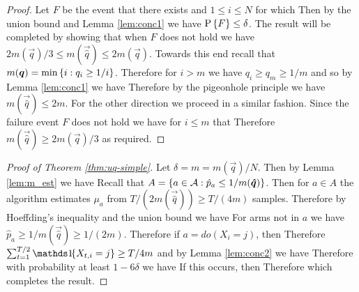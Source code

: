 \begin{proof}
Let $F$ be the event that there exists and $1 \leq i \leq N$ for which
Then by the union bound and Lemma \ref{lem:conc1} we have $\P{F} \leq \delta$. The result will be completed by showing that
when $F$ does not hold we have $2m(\vec{q})/3 \leq m(\vec{\hat q}) \leq 2m(\vec{q})$.
Towards this end recall that $m(\vec{q}) = \min\set{i : q_i \geq 1 / i}$.
Therefore for $i > m$ we have $q_i \geq q_m \geq 1/m$ and so by Lemma \ref{lem:conc1} we have
Therefore by the pigeonhole principle we have $m(\vec{\hat q}) \leq 2m$.
For the other direction we proceed in a similar fashion. Since the failure event $F$ does not hold we have for $i \leq m$ that
Therefore $m(\vec{\hat q}) \geq 2m(\vec{q}) / 3$ as required. 
\end{proof}

\begin{proof}[Proof of Theorem \ref{thm:uq-simple}]
Let $\delta = m = m(\vec{q}) / N$. Then by Lemma \ref{lem:m_est} we have 
Recall that $A = \set{a \in \actions : \hat p_a \leq 1/m(\vec{\hat q})}$. Then
for $a \in A$ the algorithm estimates $\mu_a$ from $T/(2m(\vec{\hat q})) \geq T/(4m)$ samples.
Therefore by Hoeffding's inequality and the union bound we have
For arms not in $a$ we have $\hat p_a \geq 1/m(\vec{\hat q}) \geq 1/(2m)$.
Therefore if $a = do(X_i = j)$, then 
Therefore $\sum_{t=1}^{T/2} \ind{X_{t,i} = j} \geq T/4m$
and by Lemma \ref{lem:conc2} we have
Therefore with probability at least $1 - 6\delta$ we have
If this occurs, then 
Therefore
which completes the result.
\end{proof}

